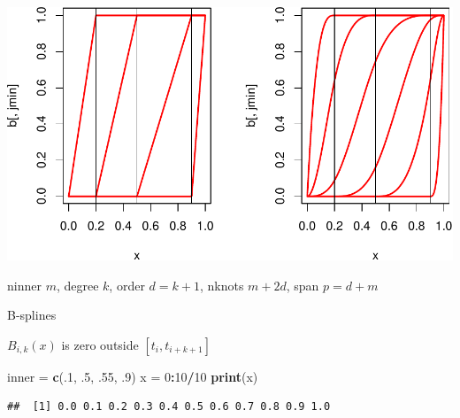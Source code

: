 \documentclass[
  12pt,
]{article}
\newenvironment{Shaded}{\begin{snugshade}}{\end{snugshade}}
\newcommand{\DecValTok}[1]{\textcolor[rgb]{0.00,0.00,0.81}{#1}}
\newcommand{\FunctionTok}[1]{\textcolor[rgb]{0.13,0.29,0.53}{\textbf{#1}}}
\newcommand{\NormalTok}[1]{#1}
\newcommand{\OtherTok}[1]{\textcolor[rgb]{0.56,0.35,0.01}{#1}}
\newcommand{\SpecialCharTok}[1]{\textcolor[rgb]{0.81,0.36,0.00}{\textbf{#1}}}
\begin{document}
\includegraphics{smacofManual_files/figure-latex/bsplinesord-1.pdf}

ninner \(m\),
degree \(k\),
order \(d=k+1\),
nknots \(m + 2d\),
span \(p=d+m\)

B-splines

\(B_{i,k}(x)\) is zero outside \([t_i,t_{i+k+1}]\)

\begin{Shaded}
\begin{Highlighting}[]
\NormalTok{inner }\OtherTok{=} \FunctionTok{c}\NormalTok{(.}\DecValTok{1}\NormalTok{, .}\DecValTok{5}\NormalTok{, .}\DecValTok{55}\NormalTok{, .}\DecValTok{9}\NormalTok{)}
\NormalTok{x }\OtherTok{=} \DecValTok{0}\SpecialCharTok{:}\DecValTok{10}\SpecialCharTok{/}\DecValTok{10}
\FunctionTok{print}\NormalTok{(x)}
\end{Highlighting}
\end{Shaded}

\begin{verbatim}
##  [1] 0.0 0.1 0.2 0.3 0.4 0.5 0.6 0.7 0.8 0.9 1.0
\end{verbatim}
\end{document}
